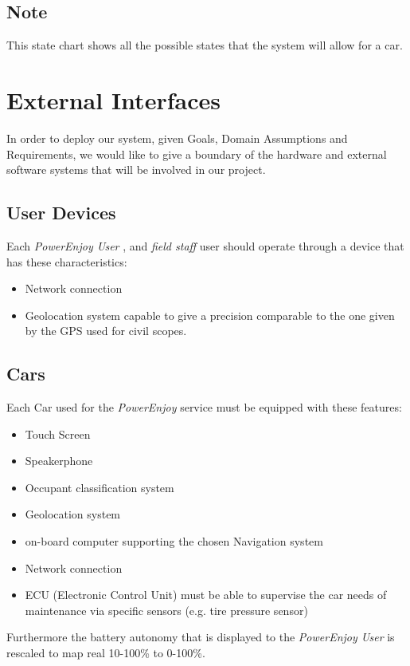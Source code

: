 \documentclass[english]{article}
\newcommand{\powerenjoy}{\textit{PowerEnjoy }}
\newcommand{\powerenjoyuser}{\textit{PowerEnjoy User }}
\newcommand{\fieldstaff}{\textit{field staff }}
\begin{document}
	\subsection*{Note}
	This state chart shows all the possible states that the system will allow for a car.

	
\section{External Interfaces}
In order to deploy our system, given Goals, Domain Assumptions and Requirements, we would like to give a boundary of the hardware and external software systems that will be involved in our project.
\subsection{User Devices}
	Each \powerenjoyuser, and \fieldstaff user should operate through a device that has these characteristics:
		\begin{itemize}
			\item Network connection
			\item Geolocation system capable to give a precision comparable to the one given by the GPS used for civil scopes.
		\end{itemize}
\subsection{Cars}
	Each Car used for the \powerenjoy service must be equipped with these features:
	\begin{itemize}
		\item Touch Screen
		\item Speakerphone
		\item Occupant classification system
		\item Geolocation system
		\item on-board computer supporting the chosen Navigation system
		\item Network connection
		\item ECU (Electronic Control Unit) must be able to supervise the car needs of maintenance via specific sensors (e.g. tire pressure sensor)
		\end{itemize}
	Furthermore the battery autonomy that is displayed to the \powerenjoyuser is rescaled to map real 10-100\% to 0-100\%.
\end{document}
